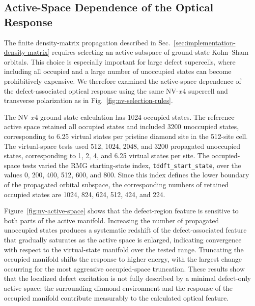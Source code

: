 \subsection{Active-Space Dependence of the Optical Response}
\label{sec:nv-active-space}

The finite density-matrix propagation described in
Sec.~\ref{sec:implementation-density-matrix} requires selecting an
active subspace of ground-state Kohn--Sham orbitals.  This choice is
especially important for large defect supercells, where including all
occupied and a large number of unoccupied states can become
prohibitively expensive.  We therefore examined the active-space
dependence of the defect-associated optical response using the same
NV-$x4$ supercell and transverse polarization as in
Fig.~\ref{fig:nv-selection-rules}.

The NV-$x4$ ground-state calculation has 1024 occupied states.  The
reference active space retained all occupied states and included
3200 unoccupied states, corresponding to 6.25 virtual states per
pristine diamond site in the 512-site cell.  The virtual-space tests
used 512, 1024, 2048, and 3200 propagated unoccupied states,
corresponding to 1, 2, 4, and 6.25 virtual states per site.  The
occupied-space tests varied the RMG starting-state index,
\texttt{tddft\_start\_state}, over the values 0, 200, 400, 512, 600,
and 800.  Since this index defines the lower boundary of the propagated
orbital subspace, the corresponding numbers of retained occupied
states are 1024, 824, 624, 512, 424, and 224.

Figure~\ref{fig:nv-active-space} shows that the defect-region feature
is sensitive to both parts of the active manifold.  Increasing the
number of propagated unoccupied states produces a systematic redshift
of the defect-associated feature that gradually saturates as the active
space is enlarged, indicating convergence with respect to the
virtual-state manifold over the tested range.  Truncating the occupied
manifold shifts the response to higher energy, with the largest change
occurring for the most aggressive occupied-space truncation.  These
results show that the localized defect excitation is not fully
described by a minimal defect-only active space; the surrounding
diamond environment and the response of the occupied manifold
contribute measurably to the calculated optical feature.

